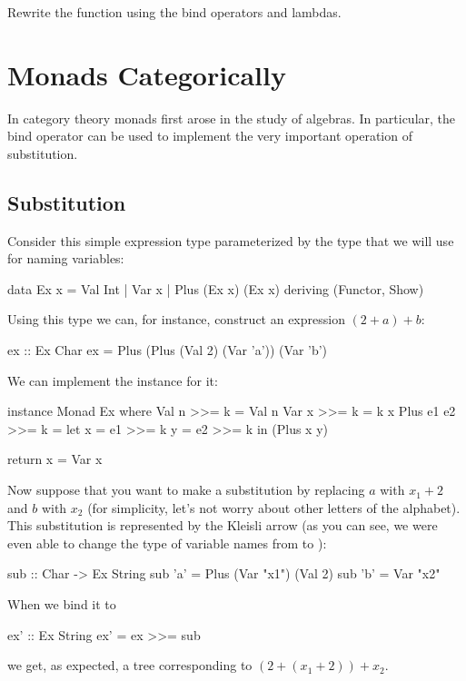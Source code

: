 \documentclass[DaoFP]{subfiles}
\begin{document}
\begin{exercise}
Rewrite the  function using the bind operators and lambdas.
\end{exercise}

\section{Monads Categorically}

In category theory monads first arose in the study of algebras. In particular, the bind operator can be used to implement the very important operation of substitution. 

\subsection{Substitution}

Consider this simple expression type parameterized by the type that we will use for naming variables:
\begin{haskell}
data Ex x = Val Int 
          | Var x 
          | Plus (Ex x) (Ex x) 
 deriving (Functor, Show)
\end{haskell}
Using this type we can, for instance, construct an expression $(2 + a) + b$:
\begin{haskell}
ex :: Ex Char
ex = Plus (Plus (Val 2) (Var 'a')) (Var 'b')
\end{haskell}
We can implement the  instance for it:
\begin{haskell}
instance Monad Ex where
  Val n >>= k = Val n
  Var x >>= k = k x
  Plus e1 e2 >>= k = 
    let x = e1 >>= k
        y = e2 >>= k
    in (Plus x y)
    
  return x = Var x 
\end{haskell}

Now suppose that you want to make a substitution by replacing $a$ with $x_1 + 2$ and $b$ with $x_2$ (for simplicity, let's not worry about other letters of the alphabet). This substitution is represented by the Kleisli arrow  (as you can see, we were even able to change the type of variable names from  to ):
\begin{haskell}
sub :: Char -> Ex String
sub 'a' = Plus (Var "x1") (Val 2)
sub 'b' = Var "x2"
\end{haskell}
When we bind it to 
\begin{haskell}
ex' :: Ex String
ex' = ex >>= sub
\end{haskell}
we get, as expected, a tree corresponding to $(2 + (x_1 + 2)) + x_2$.
\end{document}
